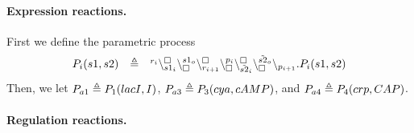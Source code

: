 \paragraph{Expression reactions.}
First we define the parametric process
\[
\begin{array}{lcl}
 P_i(s1,s2) & \triangleq & {}^{r_i}\backslash_{s1_i}^{\scriptstyle {\square}}\backslash_{\scriptstyle {\square}}^{s1_o}
 \backslash_{r_{i+1}}^{\scriptstyle {\square}}\backslash_{\scriptstyle {\square}}^{p_{i}}\backslash_{\tilde{s2}_i}^{\scriptstyle {\square}}
\backslash_{\scriptstyle {\square}}^{\tilde{s2}_o}\backslash_{p_{i+1}}.P_i(s1,s2)\\
\end{array}
\]
Then, we let $P_{a1}\triangleq P_1(lacI,I)$,  $P_{a3} \triangleq P_3(cya,cAMP)$, and $P_{a4} \triangleq P_4(crp,CAP)$.
\paragraph{Regulation reactions.}

